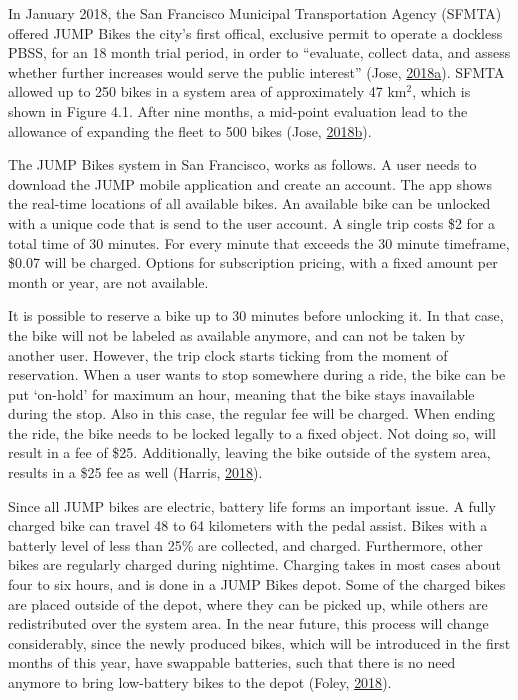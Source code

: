 \documentclass[12pt,oneside]{reedthesis}
\begin{document}
In January 2018, the San Francisco Municipal Transportation Agency
(SFMTA) offered JUMP Bikes the city's first offical, exclusive permit to
operate a dockless PBSS, for an 18 month trial period, in order to
``evaluate, collect data, and assess whether further increases would
serve the public interest'' (Jose,
\protect\hyperlink{ref-sfmta2018one}{2018}\protect\hyperlink{ref-sfmta2018one}{a}).
SFMTA allowed up to 250 bikes in a system area of approximately 47
km\(^2\), which is shown in Figure 4.1. After nine months, a mid-point
evaluation lead to the allowance of expanding the fleet to 500 bikes
(Jose,
\protect\hyperlink{ref-sfmta2018two}{2018}\protect\hyperlink{ref-sfmta2018two}{b}).

The JUMP Bikes system in San Francisco, works as follows. A user needs
to download the JUMP mobile application and create an account. The app
shows the real-time locations of all available bikes. An available bike
can be unlocked with a unique code that is send to the user account. A
single trip costs \$2 for a total time of 30 minutes. For every minute
that exceeds the 30 minute timeframe, \$0.07 will be charged. Options
for subscription pricing, with a fixed amount per month or year, are not
available.

It is possible to reserve a bike up to 30 minutes before unlocking it.
In that case, the bike will not be labeled as available anymore, and can
not be taken by another user. However, the trip clock starts ticking
from the moment of reservation. When a user wants to stop somewhere
during a ride, the bike can be put `on-hold' for maximum an hour,
meaning that the bike stays inavailable during the stop. Also in this
case, the regular fee will be charged. When ending the ride, the bike
needs to be locked legally to a fixed object. Not doing so, will result
in a fee of \$25. Additionally, leaving the bike outside of the system
area, results in a \$25 fee as well (Harris,
\protect\hyperlink{ref-harris2018}{2018}).

Since all JUMP bikes are electric, battery life forms an important
issue. A fully charged bike can travel 48 to 64 kilometers with the
pedal assist. Bikes with a batterly level of less than 25\% are
collected, and charged. Furthermore, other bikes are regularly charged
during nightime. Charging takes in most cases about four to six hours,
and is done in a JUMP Bikes depot. Some of the charged bikes are placed
outside of the depot, where they can be picked up, while others are
redistributed over the system area. In the near future, this process
will change considerably, since the newly produced bikes, which will be
introduced in the first months of this year, have swappable batteries,
such that there is no need anymore to bring low-battery bikes to the
depot (Foley, \protect\hyperlink{ref-foley2018}{2018}).
\end{document}
